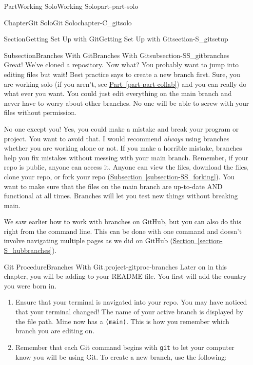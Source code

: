 \documentclass[oneside,10pt,]{book}
\newcommand{\xreffont}{\relax}
\newcommand{\mono}[1]{\texttt{#1}}
\begin{document}
\begin{partptx}{Part}{Working Solo}{}{Working Solo}{}{}{part-part-solo}
\begin{chapterptx}{Chapter}{Git Solo}{}{Git Solo}{}{}{chapter-C_gitsolo}
\begin{sectionptx}{Section}{Getting Set Up with Git}{}{Getting Set Up with Git}{}{}{section-S_gitsetup}
\typeout{************************************************}
%
\begin{subsectionptx}{Subsection}{Branches With Git}{}{Branches With Git}{}{}{subsection-SS_gitbranches}
%
%
Great! We've cloned a repository. Now what? You probably want to jump into editing files but wait! Best practice says to create a new branch first. Sure, you are working solo (if you aren't, see \hyperref[part-part-collab]{Part~{\xreffont\ref{part-part-collab}}}) and you can really do what ever you want. You could just edit everything on the main branch and never have to worry about other branches. No one will be able to screw with your files without permission.%
\par
No one except you! Yes, you could make a mistake and break your program or project. You want to avoid that. I would recommend \emph{always} using branches whether you are working alone or not. If you make a horrible mistake, branches help you fix mistakes without messing with your main branch. Remember, if your repo is public, anyone can access it. Anyone can view the files, download the files, clone your repo, or fork your repo (\hyperref[subsection-SS_forking]{Subsection~{\xreffont\ref{subsection-SS_forking}}}). You want to make sure that the files on the main branch are up-to-date AND functional at all times. Branches will let you test new things without breaking main.%
\par
We saw earlier how to work with branches on GitHub, but you can also do this right from the command line. This can be done with one command and doesn't involve navigating multiple pages as we did on GitHub (\hyperref[section-S_hubbranches]{Section~{\xreffont\ref{section-S_hubbranches}}}).%
\begin{project}{Git Procedure}{Branches With Git.}{project-gitproc-branches}%
%
%
%
Later on in this chapter, you will be adding to your README file. You first will add the country you were born in.%
\begin{enumerate}[font=\bfseries,label=(\alph*),ref=\alph*]%
\item{}Ensure that your terminal is navigated into your repo. You may have noticed that your terminal changed! The name of your active branch is displayed by the file path. Mine now has a \mono{(main)}. This is how you remember which branch you are editing on.%
\item{}Remember that each Git command begins with \mono{git} to let your computer know you will be using Git. To create a new branch, use the following:%

\end{enumerate}
\end{project}
\end{subsectionptx}
\end{sectionptx}
\end{chapterptx}
\end{partptx}
\end{document}
